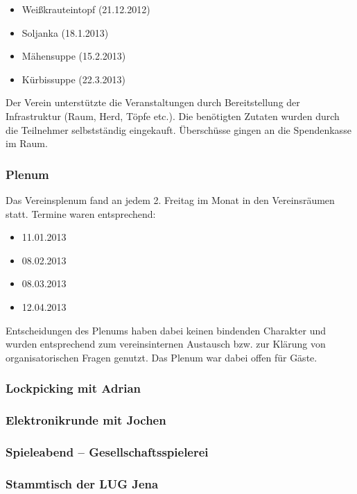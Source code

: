 \documentclass[10pt,DIV16]{scrartcl}
\begin{document}
\begin{itemize}
	\item Weißkrauteintopf (21.12.2012)
	\item Soljanka (18.1.2013)
	\item Mähensuppe (15.2.2013)
	\item Kürbissuppe (22.3.2013)
\end{itemize}

Der Verein unterstützte die Veranstaltungen durch Bereitstellung der
Infrastruktur (Raum, Herd, Töpfe etc.). Die benötigten Zutaten
wurden durch die Teilnehmer selbstständig eingekauft. Überschüsse
gingen an die Spendenkasse im Raum.

\subsubsection{Plenum}

Das Vereinsplenum fand an jedem 2. Freitag im Monat in den
Vereinsräumen statt. Termine waren entsprechend:

\begin{itemize}
	\item 11.01.2013
	\item 08.02.2013
	\item 08.03.2013
	\item 12.04.2013
\end{itemize}

Entscheidungen des Plenums haben dabei keinen bindenden Charakter
und wurden entsprechend zum vereinsinternen Austausch bzw. zur
Klärung von organisatorischen Fragen genutzt. Das Plenum war dabei
offen für Gäste.

\subsubsection{Lockpicking mit Adrian}

\subsubsection{Elektronikrunde mit Jochen}

\subsubsection{Spieleabend -- Gesellschaftsspielerei}

\subsubsection{Stammtisch der LUG Jena}
\end{document}

